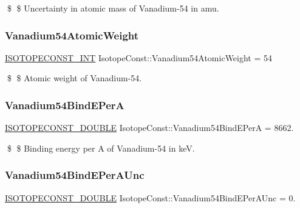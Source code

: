 \$ \$ Uncertainty in atomic mass of Vanadium-\/54 in amu. \mbox{\label{group___isotope_const-_vanadium-_v54_gacb2a74adb265f35b553c96acb8f5ffcc}} 
\subsubsection{\texorpdfstring{Vanadium54\+Atomic\+Weight}{Vanadium54AtomicWeight}}
{\footnotesize\ttfamily \mbox{\hyperlink{group___isotope_const-_macros_ga5f18360b3e99483a35c32d789e62621c}{I\+S\+O\+T\+O\+P\+E\+C\+O\+N\+S\+T\+\_\+\+I\+NT}} Isotope\+Const\+::\+Vanadium54\+Atomic\+Weight = 54}

\$ \$ Atomic weight of Vanadium-\/54. \mbox{\label{group___isotope_const-_vanadium-_v54_gae66124373a3ab6523fb1406b4196c111}} 
\subsubsection{\texorpdfstring{Vanadium54\+Bind\+E\+PerA}{Vanadium54BindEPerA}}
{\footnotesize\ttfamily \mbox{\hyperlink{group___isotope_const-_macros_ga8f45a7272ce02c0b4c65c44636ed719a}{I\+S\+O\+T\+O\+P\+E\+C\+O\+N\+S\+T\+\_\+\+D\+O\+U\+B\+LE}} Isotope\+Const\+::\+Vanadium54\+Bind\+E\+PerA = 8662.}

\$ \$ Binding energy per A of Vanadium-\/54 in keV. \mbox{\label{group___isotope_const-_vanadium-_v54_ga72417630f0f82e48bcbffb2e4b87a719}} 
\subsubsection{\texorpdfstring{Vanadium54\+Bind\+E\+Per\+A\+Unc}{Vanadium54BindEPerAUnc}}
{\footnotesize\ttfamily \mbox{\hyperlink{group___isotope_const-_macros_ga8f45a7272ce02c0b4c65c44636ed719a}{I\+S\+O\+T\+O\+P\+E\+C\+O\+N\+S\+T\+\_\+\+D\+O\+U\+B\+LE}} Isotope\+Const\+::\+Vanadium54\+Bind\+E\+Per\+A\+Unc = 0.}

